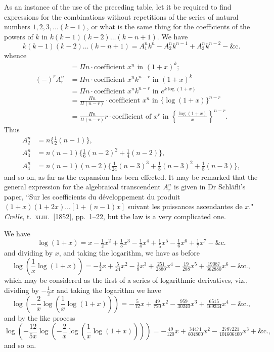 \documentclass[11pt]{article}
\begin{document}
As an instance of the use of the preceding table, let it be required to find
expressions for the combinations without repetitions of the series of natural numbers
$1, 2, 3, \ldots (k-1)$, or what is the same thing for the coefficients of the powers of $k$ in
$k(k-1)(k-2)\ldots(k-n+1)$. We have
\[ k(k-1)(k-2)\ldots(k-n+1)=A_{1}^{n}k^{n}-A_{2}^{n}k^{n-1}+A_{3}^{n}k^{n-2}-\&\text{c.} \]
whence
\begin{align*}
&= \Pi n \cdot \text{coefficient } x^{n} \text{ in } (1+x)^{k}; \\
(-)^{r}A_{r}^{n} &= \Pi n \cdot \text{coefficient } x^{n}k^{n-r} \text{ in } (1+x)^{k} \\
&= \Pi n \cdot \text{coefficient } x^{n}k^{n-r} \text{ in } e^{k\log(1+x)} \\
&= \frac{\Pi n}{\Pi(n-r)} \cdot \text{coefficient } x^{n} \text{ in } \{\log(1+x)\}^{n-r} \\
&= \frac{\Pi n}{\Pi(n-r)} r \cdot \text{coefficient of } x^{r} \text{ in } \left\{\frac{\log(1+x)}{x}\right\}^{n-r}.
\end{align*}
Thus
\begin{align*}
A_{2}^{n} &= n\{\tfrac{1}{2}(n-1)\}, \\
A_{3}^{n} &= n(n-1)\{\tfrac{1}{6}(n-2)^{2}+\tfrac{1}{4}(n-2)\}, \\
A_{4}^{n} &= n(n-1)(n-2)\{\tfrac{1}{24}(n-3)^{3}+\tfrac{1}{8}(n-3)^{2}+\tfrac{1}{8}(n-3)\},
\end{align*}
and so on, as far as the expansion has been effected. It may be remarked that the
general expression for the algebraical transcendent $A_{r}^{n}$ is given in Dr Schl\"afli's paper,
``Sur les coefficients du d\'eveloppement du produit $(1+x)(1+2x)\ldots[1+(n-1)x]$
suivant les puissances ascendantes de $x$." \textit{Crelle}, t.~\textsc{xliii}.\ [1852], pp.~1--22, but the law
is a very complicated one.

\smallskip

We have
\[ \log(1+x)=x-\tfrac{1}{2}x^{2}+\tfrac{1}{3}x^{3}-\tfrac{1}{4}x^{4}+\tfrac{1}{5}x^{5}-\tfrac{1}{6}x^{6}+\tfrac{1}{7}x^{7}-\&\text{c.} \]
and dividing by $x$, and taking the logarithm, we have as before
\[ \log\!\left(\frac{1}{x}\log(1+x)\right)=-\tfrac{1}{2}x+\tfrac{5}{24}x^{2}-\tfrac{1}{8}x^{3}+\tfrac{251}{2880}x^{4}-\tfrac{19}{288}x^{5}+\tfrac{19087}{362880}x^{6}-\&\text{c.}, \]
which may be considered as the first of a series of logarithmic derivatives, viz.,
dividing by $-\tfrac{1}{2}x$ and taking the logarithm we have
\[ \log\!\left(-\frac{2}{x}\log\!\left(\frac{1}{x}\log(1+x)\right)\right)=-\tfrac{5}{12}x+\tfrac{49}{720}x^{2}-\tfrac{959}{30240}x^{3}+\tfrac{6515}{169344}x^{4}-\&\text{c.}, \]
and by the like process
\[ \log\!\left(-\frac{12}{5x}\log\!\left(-\frac{2}{x}\log\!\left(\frac{1}{x}\log(1+x)\right)\right)\right)=-\tfrac{49}{120}x+\tfrac{34471}{604800}x^{2}-\tfrac{2787221}{101606400}x^{3}+\&\text{c.}, \]
and so on.
\end{document}
